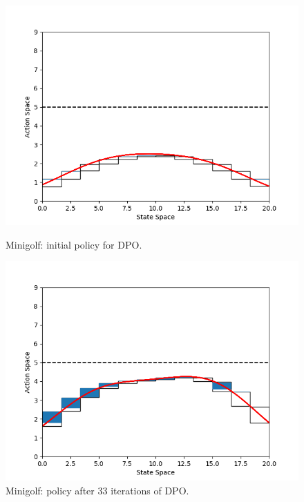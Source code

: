 \begin{figure}[h!]
	\centering
	\begin{minipage}[t]{.48\columnwidth}
		\includegraphics[width=\textwidth]{plots/it0.png}
		\caption{Minigolf: initial policy for \ac{DPO}.}
		\label{fig:mg0}
	\end{minipage}%
	\hfill
	\begin{minipage}[t]{.48\columnwidth}
		\includegraphics[width=\textwidth]{plots/it33.png}
		\caption{Minigolf: policy after $33$ iterations of \ac{DPO}.}
		\label{fig:mg33}
	\end{minipage}
\end{figure}
